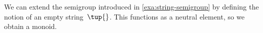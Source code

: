 \begin{example}
    \label{exa:string-monoid}
    We can extend the semigroup introduced in \cref{exa:string-semigroup} by defining the notion of an empty string~$\tup{}$.
    This functions as a neutral element, so we obtain a monoid.
\end{example}


%
%
%
%
%
%
%
%
%

